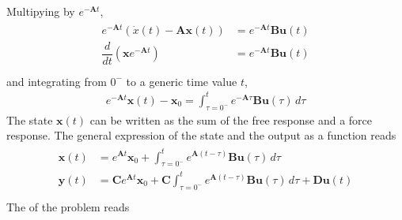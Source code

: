 \documentclass[letterpaper,10pt,english]{jupyterBook}
\begin{document}
\sphinxAtStartPar
Multipying by \(e^{-\mathbf{A} t}\),
\begin{equation*}
\begin{split}\begin{aligned}
  e^{-\mathbf{A}t} ( \dot{x}(t) - \mathbf{A} \mathbf{x}(t) ) & = e^{-\mathbf{A} t} \mathbf{B} \mathbf{u}(t) \\
    \dfrac{d}{dt} \left( \mathbf{x} e^{-\mathbf{A}t} \right) & = e^{-\mathbf{A} t} \mathbf{B} \mathbf{u}(t) \\
\end{aligned}\end{split}
\end{equation*}
\sphinxAtStartPar
and integrating from \(0^-\) to a generic time value \(t\),
\begin{equation*}
\begin{split}e^{-\mathbf{A}t} \mathbf{x}(t) - \mathbf{x}_0 = \int_{\tau=0^-}^{t} e^{-\mathbf{A}\tau} \mathbf{B} \mathbf{u} (\tau) \, d \tau\end{split}
\end{equation*}
\sphinxAtStartPar
The state \(\mathbf{x}(t)\) can be written as the sum of the free response and a force response. The general expression of the state and the output as a function reads
\begin{equation*}
\begin{split}\begin{aligned}
  \mathbf{x}(t) & = e^{\mathbf{A}t} \mathbf{x}_0 + \int_{\tau=0^-}^{t} e^{\mathbf{A}(t-\tau)} \mathbf{B} \mathbf{u} (\tau) \, d \tau \\
  \mathbf{y}(t) & = \mathbf{C} e^{\mathbf{A}t} \mathbf{x}_0 + \mathbf{C} \int_{\tau=0^-}^{t} e^{\mathbf{A}(t-\tau)} \mathbf{B} \mathbf{u} (\tau) \, d \tau  + \mathbf{D} \mathbf{u}(t) \\
\end{aligned}\end{split}
\end{equation*}
\sphinxAtStartPar
{}
The {\hyperref[\detokenize{ch/complex/laplace:complex-laplace}]{}} of the problem reads
\end{document}
